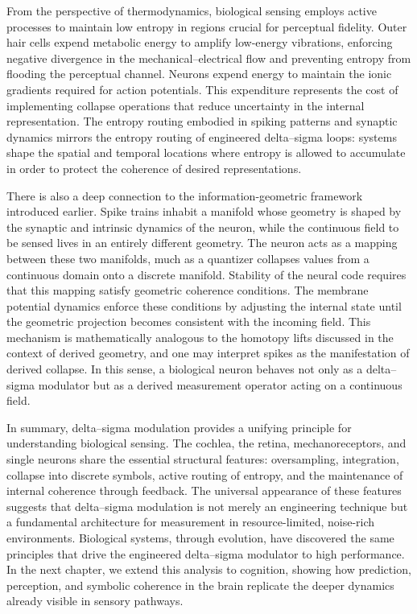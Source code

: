 From the perspective of thermodynamics, biological sensing employs active processes to maintain low entropy in regions crucial for perceptual fidelity. Outer hair cells expend metabolic energy to amplify low-energy vibrations, enforcing negative divergence in the mechanical–electrical flow and preventing entropy from flooding the perceptual channel. Neurons expend energy to maintain the ionic gradients required for action potentials. This expenditure represents the cost of implementing collapse operations that reduce uncertainty in the internal representation. The entropy routing embodied in spiking patterns and synaptic dynamics mirrors the entropy routing of engineered delta–sigma loops: systems shape the spatial and temporal locations where entropy is allowed to accumulate in order to protect the coherence of desired representations.

There is also a deep connection to the information-geometric framework introduced earlier. Spike trains inhabit a manifold whose geometry is shaped by the synaptic and intrinsic dynamics of the neuron, while the continuous field to be sensed lives in an entirely different geometry. The neuron acts as a mapping between these two manifolds, much as a quantizer collapses values from a continuous domain onto a discrete manifold. Stability of the neural code requires that this mapping satisfy geometric coherence conditions. The membrane potential dynamics enforce these conditions by adjusting the internal state until the geometric projection becomes consistent with the incoming field. This mechanism is mathematically analogous to the homotopy lifts discussed in the context of derived geometry, and one may interpret spikes as the manifestation of derived collapse. In this sense, a biological neuron behaves not only as a delta–sigma modulator but as a derived measurement operator acting on a continuous field.

In summary, delta–sigma modulation provides a unifying principle for understanding biological sensing. The cochlea, the retina, mechanoreceptors, and single neurons share the essential structural features: oversampling, integration, collapse into discrete symbols, active routing of entropy, and the maintenance of internal coherence through feedback. The universal appearance of these features suggests that delta–sigma modulation is not merely an engineering technique but a fundamental architecture for measurement in resource-limited, noise-rich environments. Biological systems, through evolution, have discovered the same principles that drive the engineered delta–sigma modulator to high performance. In the next chapter, we extend this analysis to cognition, showing how prediction, perception, and symbolic coherence in the brain replicate the deeper dynamics already visible in sensory pathways.

